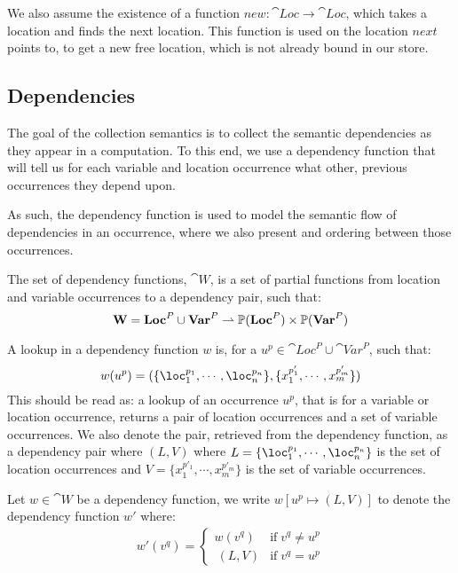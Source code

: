 \documentclass[../../master.tex]{subfiles}
\begin{document}
We also assume the existence of a function $new:\cat{Loc}\rightarrow\cat{Loc}$, which takes a location and finds the next location.
This function is used on the location $next$ points to, to get a new free location, which is not already bound in our store.

\subsection{Dependencies}\label{sec:DepFunc}
The goal of the collection semantics is to collect the semantic dependencies as they appear in a computation. 
To this end, we use a dependency function that will tell us for each variable and location occurrence what other, previous occurrences they depend upon.

As such, the dependency function is used to model the semantic flow of dependencies in an occurrence, where we also present and ordering between those occurrences.


\begin{definition}\label{def:DepFunc}
	The set of dependency functions, $\cat{W}$, is a set of partial functions from location and variable occurrences to a dependency pair, such that:
	$$\textbf{W}=\textbf{Loc}^P\cup\textbf{Var}^P\rightharpoonup\mathbb{P}(\textbf{Loc}^P)\times\mathbb{P}(\textbf{Var}^P)$$
\end{definition}
A lookup in a dependency function $w$ is, for a $u^p\in\cat{Loc}^P\cup\cat{Var}^P$, such that:
$$w(u^p)=(\{\loc_1^{p_1},\cdots,\loc_n^{p_n}\},\{x_1^{p'_1},\cdots,x_m^{p'_m}\})$$
This should be read as: a lookup of an occurrence $u^p$, that is for a variable or location occurrence, returns a pair of location occurrences and a set of variable occurrences.
We also denote the pair, retrieved from the dependency function, as a dependency pair where $(L,V)$ where $L=\{\loc_1^{p_1},\cdots,\loc_n^{p_n}\}$ is the set of location occurrences and $V=\{x_1^{p'_1},\cdots,x_m^{p'_m}\}$ is the set of variable occurrences.

\begin{definition}[Update of $w$]\label{def:DepExt}
	Let $w\in\cat{W}$ be a dependency function, we write $w[u^p\mapsto(L,V)]$ to denote the dependency function $w'$ where:
	\begin{align*}
		w'(v^q)=
		\left\{\begin{matrix}
			w(v^q) & \mbox{if}\;v^q\neq u^p\\\	 
			(L,V) & \mbox{if}\;v^q=u^p
		\end{matrix}\right.
	\end{align*}
\end{definition}
\end{document}
